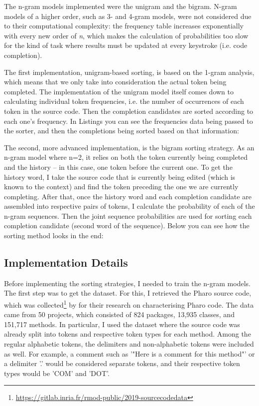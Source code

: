 \documentclass[sigplan,screen]{acmart}
\begin{document}
The n-gram models implemented were the unigram and the bigram. N-gram models of a higher order, such as 3- and 4-gram models, were not considered due to their computational complexity: the frequency table increases exponentially with every new order of \textit{n}, which makes the calculation of probabilities too slow for the kind of task where results must be updated at every keystroke (i.e. code completion).

The first implementation, unigram-based sorting, is based on the 1-gram analysis, which means that we only take into consideration the actual token being completed. The implementation of the unigram model itself comes down to calculating individual token frequencies, i.e. the number of occurrences of each token in the source code. Then the completion candidates are sorted according to each one's frequency. In Listings you can see the frequencies data being passed to the sorter, and then the completions being sorted based on that information:

The second, more advanced implementation, is the bigram sorting strategy. As an n-gram model where n=2, it relies on both the token currently being completed and the history -- in this case, one token before the current one. To get the history word, I take the source code that is currently being edited (which is known to the context) and find the token preceding the one we are currently completing. After that, once the history word and each completion candidate are assembled into respective pairs of tokens, I calculate the probability of each of the n-gram sequences. Then the joint sequence probabilities are used for sorting each completion candidate (second word of the sequence). Below you can see how the sorting method looks in the end:

\subsection{Implementation Details}
Before implementing the sorting strategies, I needed to train the n-gram models. The first step was to get the dataset. For this, I retrieved the Pharo source code, which was collected\footnote{\url{https://gitlab.inria.fr/rmod-public/2019-sourcecodedata}} by \cite{Zait20a} for their research on characterising Pharo code. The data came from 50 projects, which consisted of 824 packages, 13,935 classes, and 151,717 methods. In particular, I used the dataset where the source code was already split into tokens and respective token types for each method. Among the regular alphabetic tokens, the delimiters and non-alphabetic tokens were included as well. For example, a comment such as '"Here is a comment for this method"' or a delimiter '.' would be considered separate tokens, and their respective token types would be 'COM' and 'DOT'.
\end{document}
